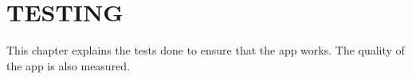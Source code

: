 \chapter{TESTING}
\label{chap:testing}

This chapter explains the tests done to ensure that the app works. The quality of the app is also measured.




